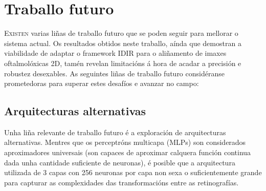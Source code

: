 \chapter{Traballo futuro}
\label{chap:Traballo futuro}

\lettrine{E}{xisten} varias liñas de traballo futuro que se poden seguir para mellorar o sistema actual.
 Os resultados obtidos neste traballo, aínda que demostran a viabilidade de adaptar o framework IDIR para o aliñamento de imaxes oftalmolóxicas 2D, tamén revelan limitacións á hora de acadar a precisión e robustez desexables.
 As seguintes liñas de traballo futuro considéranse prometedoras para superar estes desafíos e avanzar no campo:





\section{Arquitecturas alternativas}
\label{sec:Arquitecturas alternativas}

Unha liña relevante de traballo futuro é a exploración de arquitecturas alternativas. 
Mentres que os perceptróns multicapa (MLPs) son considerados aproximadores universais \cite{HORNIK1989359} (son capaces de aproximar calquera función continua dada unha cantidade suficiente de neuronas), é posible que a arquitectura utilizada de 3 capas con 256 neuronas por capa non sexa o suficientemente grande para capturar as complexidades das transformacións entre as retinografías.

